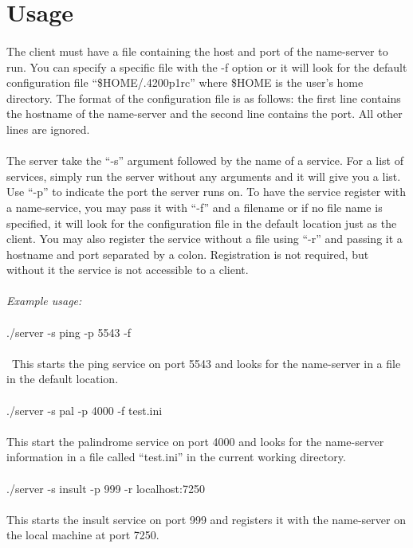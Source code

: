 \documentclass[a4paper,11pt]{article}
\begin{document}
\section{Usage}
\paragraph{}The client must have a file containing the host and port of the name-server to run. You can specify a specific file with the -f option or it will look for the default configuration file ``\$HOME/.4200p1rc'' where \$HOME is the user's home directory. The format of the configuration file is as follows: the first line contains the hostname of the name-server and the second line contains the port. All other lines are ignored. 
\paragraph{}The server take the ``-s'' argument followed by the name of a service. For a list of services, simply run the server without any arguments and it will give you a list. Use ``-p'' to indicate the port the server runs on. To have the service register with a name-service, you may pass it with ``-f'' and a filename or if no file name is specified, it will look for the configuration file in the default location just as the client. You may also register the service without a file using ``-r'' and passing it a hostname and port separated by a colon.  Registration is not required, but without it the service is not accessible to a client.
\\
\\
\emph{Example usage:}\\
\\
./server -s ping -p 5543 -f\\
\\\
This starts the ping service on port 5543 and looks for the name-server in a file in the default location.\\
\\
./server -s pal -p 4000 -f test.ini\\
\\
This start the palindrome service on port 4000 and looks for the name-server information in a file called ``test.ini'' in the current working directory.\\
\\
./server -s insult -p 999 -r localhost:7250\\
\\
This starts the insult service on port 999 and registers it with the name-server on the local machine at port 7250.\\
\end{document}
